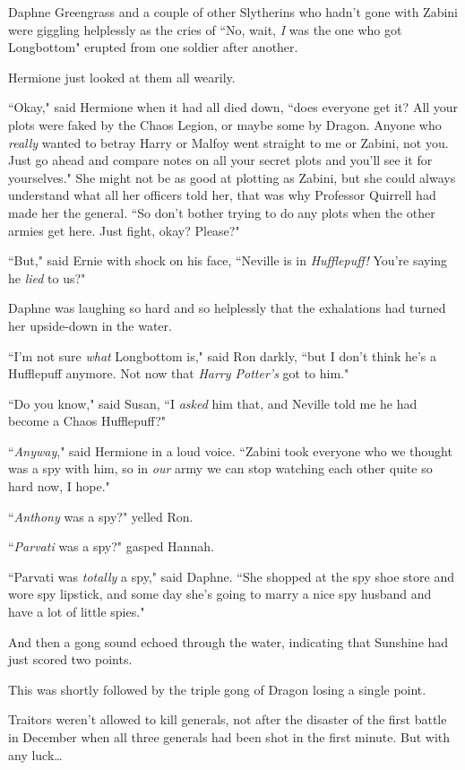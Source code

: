 Daphne Greengrass and a couple of other Slytherins who hadn't gone with Zabini were giggling helplessly as the cries of ``No, wait, \emph{I} was the one who got Longbottom" erupted from one soldier after another.

Hermione just looked at them all wearily.

``Okay," said Hermione when it had all died down, ``does everyone get it? All your plots were faked by the Chaos Legion, or maybe some by Dragon. Anyone who \emph{really} wanted to betray Harry or Malfoy went straight to me or Zabini, not you. Just go ahead and compare notes on all your secret plots and you'll see it for yourselves." She might not be as good at plotting as Zabini, but she could always understand what all her officers told her, that was why Professor Quirrell had made her the general. ``So don't bother trying to do any plots when the other armies get here. Just fight, okay? Please?"

``But," said Ernie with shock on his face, ``Neville is in \emph{Hufflepuff!} You're saying he \emph{lied} to us?"

Daphne was laughing so hard and so helplessly that the exhalations had turned her upside-down in the water.

``I'm not sure \emph{what} Longbottom is," said Ron darkly, ``but I don't think he's a Hufflepuff anymore. Not now that \emph{Harry Potter's} got to him."

``Do you know," said Susan, ``I \emph{asked} him that, and Neville told me he had become a Chaos Hufflepuff?"

``\emph{Anyway}," said Hermione in a loud voice. ``Zabini took everyone who we thought was a spy with him, so in \emph{our} army we can stop watching each other quite so hard now, I hope."

``\emph{Anthony} was a spy?" yelled Ron.

``\emph{Parvati} was a spy?" gasped Hannah.

``Parvati was \emph{totally} a spy," said Daphne. ``She shopped at the spy shoe store and wore spy lipstick, and some day she's going to marry a nice spy husband and have a lot of little spies."

And then a gong sound echoed through the water, indicating that Sunshine had just scored two points.

This was shortly followed by the triple gong of Dragon losing a single point.

Traitors weren't allowed to kill generals, not after the disaster of the first battle in December when all three generals had been shot in the first minute. But with any luck{\ldots}

